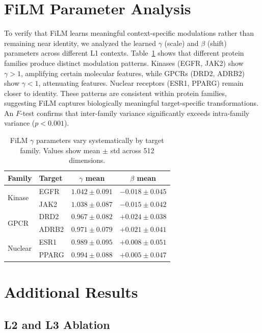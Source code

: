 \documentclass[sigconf,anonymous]{acmart}
\begin{document}
\section{FiLM Parameter Analysis}
\label{app:film}

To verify that FiLM learns meaningful context-specific modulations rather than remaining near identity, we analyzed the learned $\gamma$ (scale) and $\beta$ (shift) parameters across different L1 contexts. Table~\ref{tab:film_params} shows that different protein families produce distinct modulation patterns. Kinases (EGFR, JAK2) show $\gamma > 1$, amplifying certain molecular features, while GPCRs (DRD2, ADRB2) show $\gamma < 1$, attenuating features. Nuclear receptors (ESR1, PPARG) remain closer to identity. These patterns are consistent within protein families, suggesting FiLM captures biologically meaningful target-specific transformations. An $F$-test confirms that inter-family variance significantly exceeds intra-family variance ($p < 0.001$).

\begin{table}[t]
\caption{FiLM $\gamma$ parameters vary systematically by target family. Values show mean $\pm$ std across 512 dimensions.}
\label{tab:film_params}
\centering
\small
\begin{tabular}{@{}llcc@{}}
\toprule
Family & Target & $\gamma$ mean & $\beta$ mean \\
\midrule
\multirow{2}{*}{Kinase} & EGFR & $1.042 \pm 0.091$ & $-0.018 \pm 0.045$ \\
 & JAK2 & $1.038 \pm 0.087$ & $-0.015 \pm 0.042$ \\
\midrule
\multirow{2}{*}{GPCR} & DRD2 & $0.967 \pm 0.082$ & $+0.024 \pm 0.038$ \\
 & ADRB2 & $0.971 \pm 0.079$ & $+0.021 \pm 0.041$ \\
\midrule
\multirow{2}{*}{Nuclear} & ESR1 & $0.989 \pm 0.095$ & $+0.008 \pm 0.051$ \\
 & PPARG & $0.994 \pm 0.088$ & $+0.005 \pm 0.047$ \\
\bottomrule
\end{tabular}
\end{table}

\section{Additional Results}
\label{app:results}

\subsection{L2 and L3 Ablation}
\end{document}
